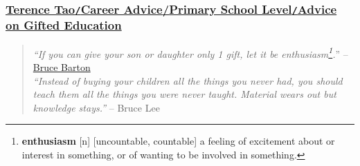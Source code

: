 \documentclass{article}
\numberwithin{equation}{section}
\begin{document}
\subsubsection{\href{https://terrytao.wordpress.com/career-advice/advice-on-gifted-education/}{Terence Tao\texttt{/}Career Advice{/}Primary School Level\texttt{/}Advice on Gifted Education}}
\begin{quotation}
	\textit{``If you can give your son or daughter only 1 gift, let it be enthusiasm\footnote{\textbf{enthusiasm} [n] [uncountable, countable] a feeling of excitement about or interest in something, or of wanting to be involved in something.}.}'' -- \href{http://en.wikipedia.org/wiki/Bruce_Fairchild_Barton}{Bruce Barton}\\
	
	\textit{``Instead of buying your children all the things you never had, you should teach them all the things you were never taught. Material wears out but knowledge stays.''} -- Bruce Lee
\end{quotation}
\end{document}
